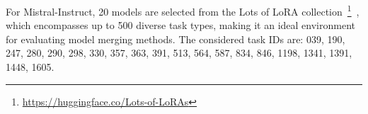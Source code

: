 For Mistral-Instruct, 20 models are selected from the Lots of LoRA collection~\footnote{\url{https://huggingface.co/Lots-of-LoRAs}}~\cite{bruel2024compress}, which encompasses up to 500 diverse task types, making it an ideal environment for evaluating model merging methods.
The considered task IDs are: 039, 190, 247, 280, 290, 298, 330, 357, 363, 391, 513, 564, 587, 834, 846, 1198, 1341, 1391, 1448, 1605.







